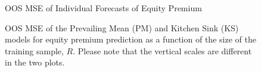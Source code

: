 \documentclass[12pt]{article}
\begin{document}
\begin{figure}
\centering
\large{OOS MSE of Individual Forecasts of Equity Premium}
\caption{OOS MSE of the Prevailing Mean (PM) and
    Kitchen Sink (KS) models for equity premium prediction as
    a function of the size of the training sample, $R$.  Please note
    that the vertical scales are different in the two plots.}
\label{fig:empirics3}
\end{figure}
\end{document}

